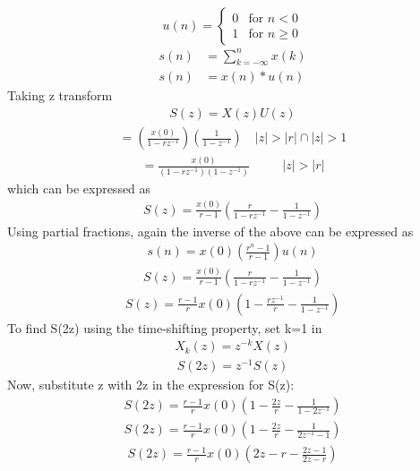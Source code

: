 \documentclass[journal,12pt,twocolumn]{IEEEtran}
\theoremstyle{remark}
\begin{document}
\[
u(n) = 
\begin{cases} 
0 & \text{for } n < 0 \\
1 & \text{for } n \geq 0 
\end{cases}
\]
\begin{align}
s(n) &= \sum_{k=-\infty}^{n} x(k) \\
s(n) &= x(n)*u(n)
\end{align}
Taking z transform
\begin{align}
S(z) = X(z)U(z)
\end{align}
\begin{align}
= \left(\frac{x(0)}{1 - rz^{-1}}\right) \left(\frac{1}{1 - z^{-1}}\right)  \quad |z| > |r| \cap |z| > 1
\end{align}
\begin{align}
= \frac{x(0)}{(1 - rz^{-1})(1 - z^{-1})} && \quad |z| > |r|
\end{align}
which can be expressed as
\begin{align}
S(z) = \frac{x(0)}{r-1} \left(\frac{r}{1-rz^{-1}} - \frac{1}{1-z^{-1}}\right)
\end{align}
Using partial fractions, again the inverse of the above can be expressed as 
\begin{align}
s(n) = x(0)\left(\frac{r^{n}-1}{r-1}\right)u(n)
\end{align}
\begin{align}
S(z) = \frac{x(0)}{r-1}\left(\frac{r}{1-rz^{-1}} - \frac{1}{1-z^{-1}}\right) 
\end{align}
\begin{align}
S(z) = \frac{r-1}{r}x(0)\left(1 - \frac{rz^{-1}}{r} - \frac{1}{1-z^{-1}}\right) 
\end{align}
To find S(2z) using the time-shifting property, set k=1 in 
\begin{align}
X_k(z)=z^{-k}X(z)
\end{align}
\begin{align}
S(2z) = z^{-1}S(z)
\end{align}
Now, substitute z with 2z in the expression for S(z): 
\begin{align}
S(2z) = \frac{r-1}{r}x(0)\left(1 - \frac{2z}{r} - \frac{1}{1-2z^{-1}}\right)
\end{align}
\begin{align}
S(2z) = \frac{r-1}{r}x(0)\left(1 - \frac{2z}{r} - \frac{1}{2z^{-1}-1}\right) 
\end{align}
\begin{align}
S(2z) = \frac{r-1}{r}x(0)\left(2z - r - \frac{2z-1}{2z-r}\right) 
\end{align}
\end{document}

